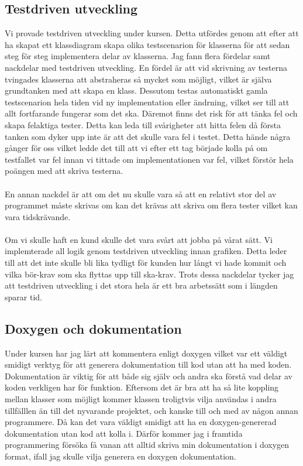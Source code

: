 \documentclass{TDP003mall}
\begin{document}
	\subsection{Testdriven utveckling}
	Vi provade testdriven utveckling under kursen. Detta utfördes genom att efter att ha skapat ett klassdiagram skapa olika testscenarion för klasserna för att sedan steg för steg implementera delar av klasserna. Jag fann flera fördelar samt nackdelar med testdriven utveckling. En fördel är att vid skrivning av testerna tvingades klasserna att abstraheras så mycket som möjligt, vilket är själva grundtanken med att skapa en klass. Dessutom testas automatiskt gamla testscenarion hela tiden vid ny implementation eller ändrning, vilket ser till att allt fortfarande fungerar som det ska. Däremot finns det risk för att tänka fel och skapa felaktiga tester. Detta kan leda till svårigheter att hitta felen då första tanken som dyker upp inte är att det skulle vara fel i testet. Detta hände några gånger för oss vilket ledde det till att vi efter ett tag började kolla på om testfallet var fel innan vi tittade om implementationen var fel, vilket förstör hela poängen med att skriva testerna. 
	\\ \\
	En annan nackdel är att om det nu skulle vara så att en relativt stor del av programmet måste skrivas om kan det krävas att skriva om flera tester vilket kan vara tidskrävande. 
	\\ \\
	Om vi skulle haft en kund skulle det vara svårt att jobba på vårat sätt. Vi implemterade all logik genom testdriven utveckling innan grafiken. Detta leder till att det inte skulle bli lika tydligt för kunden hur långt vi hade kommit och vilka bör-krav som ska flyttas upp till ska-krav. Trots dessa nackdelar tycker jag att testdriven utveckling i det stora hela är ett bra arbetssätt som i längden sparar tid.
	
	\subsection{Doxygen och dokumentation}
	Under kursen har jag lärt att kommentera enligt doxygen vilket var ett väldigt smidigt verktyg för att generera dokumentation till kod utan att ha med koden. Dokumentation är viktig för att både sig själv och andra ska förstå vad delar av koden verkligen har för funktion. Eftersom det är bra att ha så lite koppling mellan klasser som möjligt kommer klassen troligtvis vilja användas i andra tillfälllen än till det nyvarande projektet, och kanske till och med av någon annan programmere. Då kan det vara väldigt smidigt att ha en doxygen-genererad dokumentation utan kod att kolla i. Därför kommer jag i framtida programmering försöka få vanan att alltid skriva min dokumentation i doxygen format, ifall jag skulle vilja generera en doxygen dokumentation.
	
\end{document}
